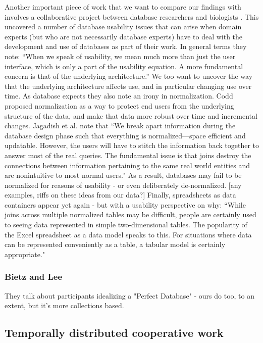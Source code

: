 Another important piece of work that we want to compare our findings with involves a collaborative project between database researchers and biologists   \cite{jagadish2007making}. This uncovered a number of database usability issues that can arise when domain experts (but who are not necessarily database experts) have to deal with the development and use of databases as part of their work. In general terms they note: “When we speak of usability, we mean much more than just the user interface, which is only a part of the usability equation. A more fundamental concern is that of the underlying architecture.” We too want to uncover the way that the underlying architecture affects use, and in particular changing use over time. As database expects they also note an irony in normalization. Codd proposed normalization as a way to protect end users from the underlying structure of the data, and make that data more robust over time and incremental changes. Jagadish et al. note that “We break apart information during the database design phase such that everything is normalized—space efficient and updatable. However, the users will have to stitch the information back together to answer most of the real queries. The fundamental issue is that joins destroy the connections between information pertaining to the same real world entities and are nonintuitive to most normal users." As a result, databases may fail to be normalized for reasons of usability - or even deliberately de-normalized. [any examples, riffs on these ideas from our data?] Finally, spreadsheets as data containers appear yet again - but with a usability perspective on why: “While joins across multiple normalized tables may be difficult, people are certainly used to seeing data represented in simple two-dimensional tables. The popularity of the Excel spreadsheet as a data model speaks to this. For situations where data can be represented conveniently as a table, a tabular model is certainly appropriate."

\subsubsection{Bietz and Lee}

They talk about participants idealizing a "Perfect Database" - ours do too, to an extent, but it's more collections based.

\subsection{Temporally distributed cooperative work}

